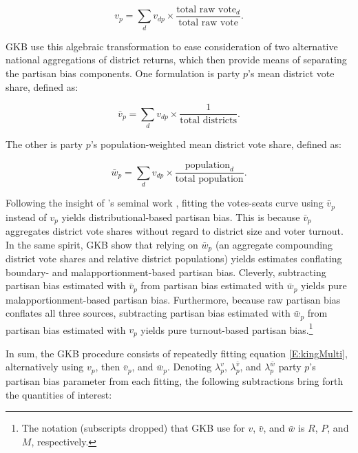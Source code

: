 \documentclass[letter,12pt]{article}
\begin{document}
\begin{equation}
v_p  = \sum_d v_{dp} \times \frac{\text{total raw vote}_d}{\text{total raw vote}}.  %
\end{equation}

\noindent GKB use this algebraic transformation to ease consideration of two alternative national aggregations of district returns, which then provide means of separating the partisan bias components. One formulation is party $p$'s mean district vote share, defined as:

\begin{equation}
\bar{v}_p  = \sum_d v_{dp} \times \frac{1}{\text{total districts}}. %
\end{equation}

\noindent The other is party $p$'s population-weighted mean district vote share, defined as:

\begin{equation}
\bar{w}_p  = \sum_d v_{dp} \times \frac{\text{population}_d}{\text{total population}}. %
\end{equation}


Following the insight of \citeauthor{tufte1973seatsVotes}'s \citeyearpar{tufte1973seatsVotes} seminal work \citep[further elaborated in][]{gelman.king.1994EvalElSysRedis}, fitting the votes-seats curve using $\bar{v}_p$ instead of $v_p$ yields distributional-based partisan bias. This is because $\bar{v}_p$ aggregates district vote shares without regard to district size and voter turnout. In the same spirit, GKB show that relying on $\bar{w}_p$ (an aggregate compounding district vote shares and relative district populations) yields estimates conflating boundary- and malapportionment-based partisan bias. Cleverly, subtracting partisan bias estimated with $\bar{v}_p$ from partisan bias estimated with $\bar{w}_p$ yields pure malapportionment-based partisan bias. Furthermore, because raw partisan bias conflates all three sources, subtracting partisan bias estimated with $\bar{w}_p$ from partisan bias estimated with $v_p$ yields pure turnout-based partisan bias.\footnote{The notation (subscripts dropped) that GKB use for $v$, $\bar{v}$, and $\bar{w}$ is $R$, $P$, and $M$, respectively.}  

In sum, the GKB procedure consists of repeatedly fitting equation \ref{E:kingMulti}, alternatively using $v_p$, then $\bar{v}_p$, and $\bar{w}_p$. Denoting $\lambda_p^v$, $\lambda_p^{\bar{v}}$, and $\lambda_p^{\bar{w}}$ party $p$'s partisan bias parameter from each fitting, the following subtractions bring forth the quantities of interest: 
\end{document}
